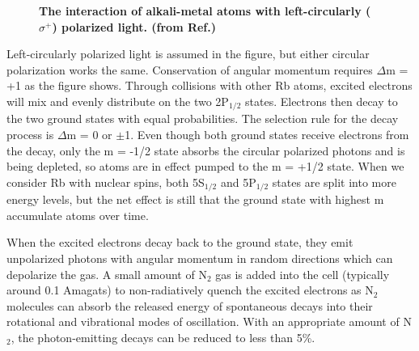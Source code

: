\begin{figure}[t!]
	\centering
	\caption{{\bf The interaction of alkali-metal atoms with left-circularly ($\sigma^{+}$) polarized light. (from Ref.\@ \cite{WalkerHapper})}}
	\label{fig:OpticalPumping}
\end{figure}

Left-circularly polarized light is assumed in the figure, but either circular polarization works the same. Conservation of angular momentum requires $\Delta$m = +1 as the figure shows. Through collisions with other Rb atoms, excited electrons will mix and evenly distribute on the two 2P$_{1/2}$ states. Electrons then decay to the two ground states with equal probabilities. The selection rule for the decay process is $\Delta$m = 0 or $\pm$1. Even though both ground states receive electrons from the decay, only the m = -1/2 state absorbs the circular polarized photons and is being depleted, so atoms are in effect pumped to the m = +1/2 state. When we consider Rb with nuclear spins, both 5S$_{1/2}$ and 5P$_{1/2}$ states are split into more energy levels, but the net effect is still that the ground state with highest m accumulate atoms over time.

When the excited electrons decay back to the ground state, they emit unpolarized photons with angular momentum in random directions which can depolarize the gas. A small amount of N$_{2}$ gas is added into the cell (typically around 0.1 Amagats) to non-radiatively quench the excited electrons as N$_{2}$ molecules can absorb the released energy of spontaneous decays into their rotational and vibrational modes of oscillation. With an appropriate amount of N$_{2}$, the photon-emitting decays can be reduced to less than 5\%.

